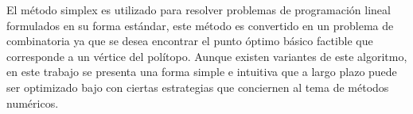 El método simplex es utilizado para resolver problemas de programación lineal formulados en su forma estándar, este método es convertido en un problema de combinatoria ya que se desea encontrar el punto óptimo básico factible que corresponde a un vértice del polítopo.
%
Aunque existen variantes de este algoritmo, en este trabajo se presenta una forma simple e intuitiva que a largo plazo puede ser optimizado bajo con ciertas estrategias que conciernen al tema de métodos numéricos.
